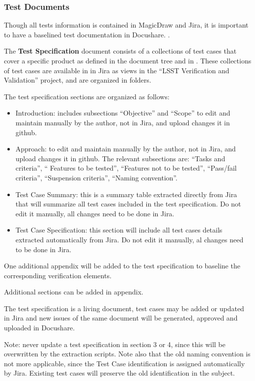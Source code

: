 \subsubsection{Test Documents}

Though all tests information is contained in MagicDraw and Jira, it is important to have a  baselined test documentation in Docushare. .

The {\bf Test Specification} document consists of a collections of test cases that cover a specific \product{} product as defined in the document tree and in .
These collections of test cases are available in in Jira as views in the ``LSST Verification and Validation'' project, and are organized in folders.

The test specification sections are organized as follows:

\begin{itemize}
\item Introduction: includes subsections ``Objective'' and ``Scope'' to edit and maintain manually by the author, not in Jira, and upload changes it in github.
\item Approach: to edit and maintain manually by the author, not in Jira, and upload changes it in github. The relevant subsections are: ``Tasks and criteria'', `` Features to be tested'', ``Features not to be tested'', ``Pass/fail criteria'', ``Suspension criteria'', ``Naming convention''.
\item Test Case Summary: this is a summary table extracted directly from Jira that will summarize all test cases included in the test specification. Do not edit it manually, all changes need to be done in Jira.
\item Test Case Specification: this section will include all test cases details extracted automatically from Jira. Do not edit it manually, al changes need to be done in Jira.
\end{itemize}

One additional appendix will be added to the test specification to baseline the corresponding verification elements.

Additional sections can be added in appendix.

The test specification is a living document, test cases may be added or updated in Jira and new issues of the same document will be generated, approved and uploaded in Docushare.

Note: never update a test specification in section 3 or 4, since this will be overwritten by the extraction scripts. Note also that the old naming convention is not more applicable, since the Test Case identification is assigned automatically by Jira. Existing test cases will preserve the old identification in the subject.

